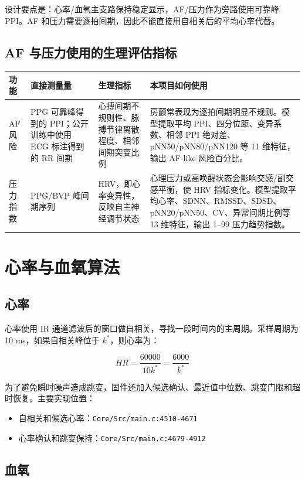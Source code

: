 \documentclass[10.5pt,a4paper,UTF8]{ctexart}
\begin{document}
设计要点是：心率/血氧主支路保持稳定显示，AF/压力作为旁路使用可靠峰 PPI。AF 和压力需要逐拍间期，因此不能直接用自相关后的平均心率代替。

\subsection{AF 与压力使用的生理评估指标}

\begin{longtable}{@{}L{2.2cm}L{3.1cm}L{3.5cm}L{5.7cm}@{}}
\toprule
功能 & 直接测量量 & 生理指标 & 本项目如何使用 \\
\midrule
AF 风险 & PPG 可靠峰得到的 PPI；公开训练中使用 ECG 标注得到的 RR 间期 & 心搏间期不规则性、脉搏节律离散程度、相邻间期突变比例 & 房颤常表现为逐拍间期明显不规则。模型提取平均 PPI、四分位距、变异系数、相邻 PPI 绝对差、pNN50/pNN80/pNN120 等 11 维特征，输出 AF-like 风险百分比。 \\
压力指数 & PPG/BVP 峰间期序列 & HRV，即心率变异性，反映自主神经调节状态 & 心理压力或高唤醒状态会影响交感/副交感平衡，使 HRV 指标变化。模型提取平均心率、SDNN、RMSSD、SDSD、pNN20/pNN50、CV、异常间期比例等 13 维特征，输出 1--99 压力趋势指数。 \\
\bottomrule
\end{longtable}

\section{心率与血氧算法}

\subsection{心率}

心率使用 IR 通道滤波后的窗口做自相关，寻找一段时间内的主周期。采样周期为 10 ms，如果自相关峰位于 \(k^\ast\)，则心率为：

\[
HR=\frac{60000}{10k^\ast}=\frac{6000}{k^\ast}
\]

为了避免瞬时噪声造成跳变，固件还加入候选确认、最近值中位数、跳变门限和超时恢复。主要实现位置：

\begin{itemize}
  \item 自相关和候选心率：\texttt{Core/Src/main.c:4510-4671}
  \item 心率确认和跳变保持：\texttt{Core/Src/main.c:4679-4912}
\end{itemize}

\subsection{血氧}
\end{document}
